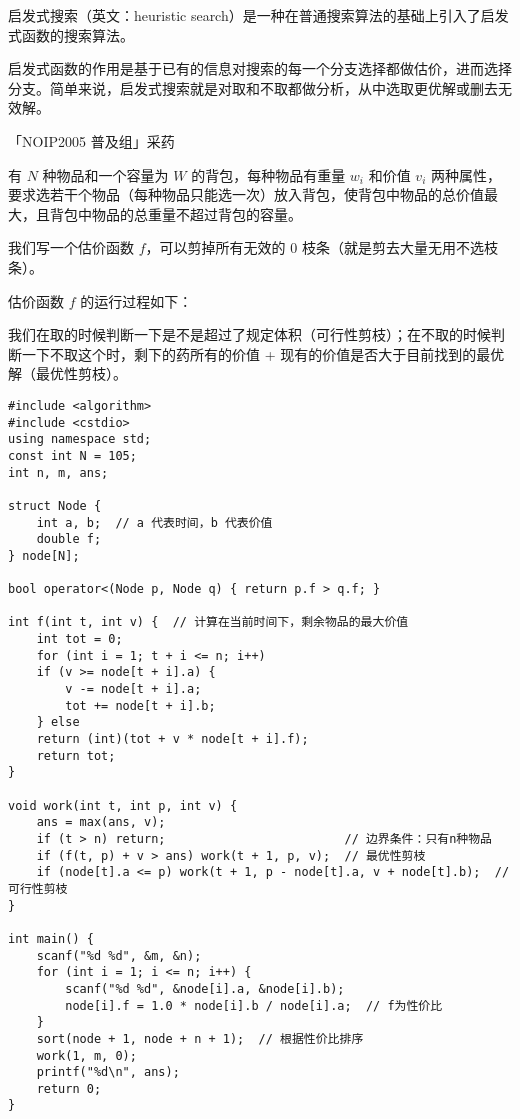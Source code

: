 启发式搜索（英文：heuristic search）是一种在普通搜索算法的基础上引入了启发式函数的搜索算法。

启发式函数的作用是基于已有的信息对搜索的每一个分支选择都做估价，进而选择分支。简单来说，启发式搜索就是对取和不取都做分析，从中选取更优解或删去无效解。

「NOIP2005 普及组」采药

有 $N$ 种物品和一个容量为 $W$ 的背包，每种物品有重量 $w_i$ 和价值 $v_i$ 两种属性，要求选若干个物品（每种物品只能选一次）放入背包，使背包中物品的总价值最大，且背包中物品的总重量不超过背包的容量。


我们写一个估价函数 $f$，可以剪掉所有无效的 $0$ 枝条（就是剪去大量无用不选枝条）。

估价函数 $f$ 的运行过程如下：

我们在取的时候判断一下是不是超过了规定体积（可行性剪枝）；在不取的时候判断一下不取这个时，剩下的药所有的价值 + 现有的价值是否大于目前找到的最优解（最优性剪枝）。

\begin{lstlisting}
#include <algorithm>
#include <cstdio>
using namespace std;
const int N = 105;
int n, m, ans;

struct Node {
	int a, b;  // a 代表时间，b 代表价值
	double f;
} node[N];

bool operator<(Node p, Node q) { return p.f > q.f; }

int f(int t, int v) {  // 计算在当前时间下，剩余物品的最大价值
	int tot = 0;
	for (int i = 1; t + i <= n; i++)
	if (v >= node[t + i].a) {
		v -= node[t + i].a;
		tot += node[t + i].b;
	} else
	return (int)(tot + v * node[t + i].f);
	return tot;
}

void work(int t, int p, int v) {
	ans = max(ans, v);
	if (t > n) return;                         // 边界条件：只有n种物品
	if (f(t, p) + v > ans) work(t + 1, p, v);  // 最优性剪枝
	if (node[t].a <= p) work(t + 1, p - node[t].a, v + node[t].b);  // 可行性剪枝
}

int main() {
	scanf("%d %d", &m, &n);
	for (int i = 1; i <= n; i++) {
		scanf("%d %d", &node[i].a, &node[i].b);
		node[i].f = 1.0 * node[i].b / node[i].a;  // f为性价比
	}
	sort(node + 1, node + n + 1);  // 根据性价比排序
	work(1, m, 0);
	printf("%d\n", ans);
	return 0;
}
\end{lstlisting}